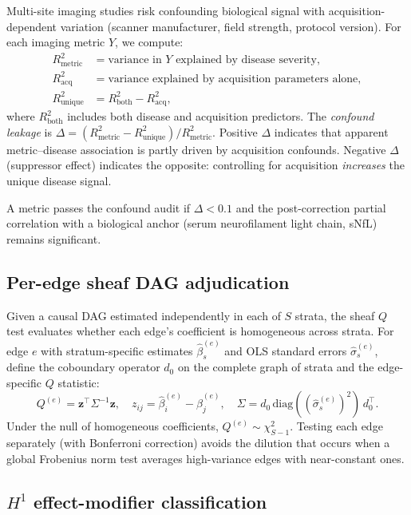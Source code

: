 \documentclass[11pt]{article}
\begin{document}
Multi-site imaging studies risk confounding biological signal with
acquisition-dependent variation (scanner manufacturer, field strength,
protocol version). For each imaging metric $Y$, we compute:
\begin{align}
R^2_{\mathrm{metric}} &= \text{variance in } Y \text{ explained by disease severity}, \\
R^2_{\mathrm{acq}} &= \text{variance explained by acquisition parameters alone}, \\
R^2_{\mathrm{unique}} &= R^2_{\mathrm{both}} - R^2_{\mathrm{acq}},
\end{align}
where $R^2_{\mathrm{both}}$ includes both disease and acquisition
predictors. The \emph{confound leakage} is
$\Delta = (R^2_{\mathrm{metric}} - R^2_{\mathrm{unique}}) / R^2_{\mathrm{metric}}$.
Positive $\Delta$ indicates that apparent metric--disease association is
partly driven by acquisition confounds. Negative $\Delta$ (suppressor
effect) indicates the opposite: controlling for acquisition
\emph{increases} the unique disease signal.

A metric passes the confound audit if $\Delta < 0.1$ and the
post-correction partial correlation with a biological anchor (serum
neurofilament light chain, sNfL) remains significant.

\subsection{Per-edge sheaf DAG adjudication}

Given a causal DAG estimated independently in each of $S$ strata, the
sheaf $Q$ test evaluates whether each edge's coefficient is homogeneous
across strata. For edge $e$ with stratum-specific estimates
$\hat\beta_s^{(e)}$ and OLS standard errors $\hat\sigma_s^{(e)}$,
define the coboundary operator $d_0$ on the complete graph of strata and
the edge-specific $Q$ statistic:
\begin{equation}
Q^{(e)} = \mathbf{z}^\top \Sigma^{-1} \mathbf{z}, \quad
z_{ij} = \hat\beta_i^{(e)} - \hat\beta_j^{(e)}, \quad
\Sigma = d_0 \, \mathrm{diag}((\hat\sigma_s^{(e)})^2) \, d_0^\top.
\end{equation}
Under the null of homogeneous coefficients, $Q^{(e)} \sim \chi^2_{S-1}$.
Testing each edge separately (with Bonferroni correction) avoids the
dilution that occurs when a global Frobenius norm test averages
high-variance edges with near-constant ones.

\subsection{$H^1$ effect-modifier classification}
\end{document}
